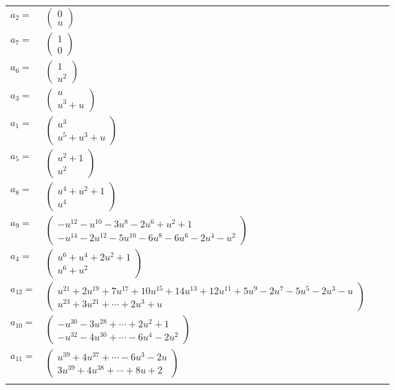 \documentclass[1p]{elsarticle_modified}
\theoremstyle{definition}
\begin{document}
\begin{tabular}{m{7pt} m{180pt} m{7pt} m{180pt} }
\flushright $a_{2}=$&$\begin{pmatrix}0\\u\end{pmatrix}$ \\
\flushright $a_{7}=$&$\begin{pmatrix}1\\0\end{pmatrix}$ \\
\flushright $a_{6}=$&$\begin{pmatrix}1\\u^2\end{pmatrix}$ \\
\flushright $a_{3}=$&$\begin{pmatrix}u\\u^3+u\end{pmatrix}$ \\
\flushright $a_{1}=$&$\begin{pmatrix}u^3\\u^5+u^3+u\end{pmatrix}$ \\
\flushright $a_{5}=$&$\begin{pmatrix}u^2+1\\u^2\end{pmatrix}$ \\
\flushright $a_{8}=$&$\begin{pmatrix}u^4+u^2+1\\u^4\end{pmatrix}$ \\
\flushright $a_{9}=$&$\begin{pmatrix}- u^{12}- u^{10}-3 u^8-2 u^6+u^2+1\\- u^{14}-2 u^{12}-5 u^{10}-6 u^8-6 u^6-2 u^4- u^2\end{pmatrix}$ \\
\flushright $a_{4}=$&$\begin{pmatrix}u^6+u^4+2 u^2+1\\u^6+u^2\end{pmatrix}$ \\
\flushright $a_{12}=$&$\begin{pmatrix}u^{21}+2 u^{19}+7 u^{17}+10 u^{15}+14 u^{13}+12 u^{11}+5 u^9-2 u^7-5 u^5-2 u^3- u\\u^{23}+3 u^{21}+\cdots+2 u^3+u\end{pmatrix}$ \\
\flushright $a_{10}=$&$\begin{pmatrix}- u^{30}-3 u^{28}+\cdots+2 u^2+1\\- u^{32}-4 u^{30}+\cdots-6 u^4-2 u^2\end{pmatrix}$ \\
\flushright $a_{11}=$&$\begin{pmatrix}u^{39}+4 u^{37}+\cdots-6 u^3-2 u\\3 u^{39}+4 u^{38}+\cdots+8 u+2\end{pmatrix}$\\&\end{tabular}
\end{document}
